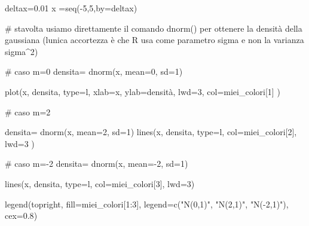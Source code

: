 \documentclass[
  italian,
  letterpaper,
]{book}
\newenvironment{Shaded}{\begin{snugshade}}{\end{snugshade}}
\newcommand{\AttributeTok}[1]{\textcolor[rgb]{0.40,0.45,0.13}{#1}}
\newcommand{\CommentTok}[1]{\textcolor[rgb]{0.37,0.37,0.37}{#1}}
\newcommand{\DecValTok}[1]{\textcolor[rgb]{0.68,0.00,0.00}{#1}}
\newcommand{\FloatTok}[1]{\textcolor[rgb]{0.68,0.00,0.00}{#1}}
\newcommand{\FunctionTok}[1]{\textcolor[rgb]{0.28,0.35,0.67}{#1}}
\newcommand{\NormalTok}[1]{\textcolor[rgb]{0.00,0.23,0.31}{#1}}
\newcommand{\OtherTok}[1]{\textcolor[rgb]{0.00,0.23,0.31}{#1}}
\newcommand{\SpecialCharTok}[1]{\textcolor[rgb]{0.37,0.37,0.37}{#1}}
\newcommand{\StringTok}[1]{\textcolor[rgb]{0.13,0.47,0.30}{#1}}
\theoremstyle{definition}
\theoremstyle{remark}
\begin{document}
\begin{Shaded}
\begin{Highlighting}[]
\NormalTok{deltax}\OtherTok{=}\FloatTok{0.01}
\NormalTok{x }\OtherTok{=}\FunctionTok{seq}\NormalTok{(}\SpecialCharTok{{-}}\DecValTok{5}\NormalTok{,}\DecValTok{5}\NormalTok{,}\AttributeTok{by=}\NormalTok{deltax)}

\CommentTok{\# stavolta usiamo direttamente il comando dnorm() per ottenere la densità della gaussiana (l\textquotesingle{}unica accortezza è che R usa come parametro sigma e non la varianza sigma\^{}2)}

\CommentTok{\# caso m=0}
\NormalTok{densita}\OtherTok{=} \FunctionTok{dnorm}\NormalTok{(x, }\AttributeTok{mean=}\DecValTok{0}\NormalTok{, }\AttributeTok{sd=}\DecValTok{1}\NormalTok{)}

\FunctionTok{plot}\NormalTok{(x, densita, }\AttributeTok{type=}\StringTok{\textquotesingle{}l\textquotesingle{}}\NormalTok{, }\AttributeTok{xlab=}\StringTok{\textquotesingle{}x\textquotesingle{}}\NormalTok{, }\AttributeTok{ylab=}\StringTok{\textquotesingle{}densità\textquotesingle{}}\NormalTok{, }\AttributeTok{lwd=}\DecValTok{3}\NormalTok{, }\AttributeTok{col=}\NormalTok{miei\_colori[}\DecValTok{1}\NormalTok{] )}

\CommentTok{\# caso m=2}

\NormalTok{densita}\OtherTok{=} \FunctionTok{dnorm}\NormalTok{(x, }\AttributeTok{mean=}\DecValTok{2}\NormalTok{, }\AttributeTok{sd=}\DecValTok{1}\NormalTok{)}
\FunctionTok{lines}\NormalTok{(x, densita, }\AttributeTok{type=}\StringTok{\textquotesingle{}l\textquotesingle{}}\NormalTok{,  }\AttributeTok{col=}\NormalTok{miei\_colori[}\DecValTok{2}\NormalTok{], }\AttributeTok{lwd=}\DecValTok{3}\NormalTok{ )}


\CommentTok{\# caso m={-}2}
\NormalTok{densita}\OtherTok{=} \FunctionTok{dnorm}\NormalTok{(x, }\AttributeTok{mean=}\SpecialCharTok{{-}}\DecValTok{2}\NormalTok{, }\AttributeTok{sd=}\DecValTok{1}\NormalTok{)}


\FunctionTok{lines}\NormalTok{(x, densita, }\AttributeTok{type=}\StringTok{\textquotesingle{}l\textquotesingle{}}\NormalTok{,  }\AttributeTok{col=}\NormalTok{miei\_colori[}\DecValTok{3}\NormalTok{], }\AttributeTok{lwd=}\DecValTok{3}\NormalTok{)}

\FunctionTok{legend}\NormalTok{(}\StringTok{\textquotesingle{}topright\textquotesingle{}}\NormalTok{, }\AttributeTok{fill=}\NormalTok{miei\_colori[}\DecValTok{1}\SpecialCharTok{:}\DecValTok{3}\NormalTok{], }\AttributeTok{legend=}\FunctionTok{c}\NormalTok{(}\StringTok{"N(0,1)"}\NormalTok{, }\StringTok{"N(2,1)"}\NormalTok{, }\StringTok{"N({-}2,1)"}\NormalTok{), }\AttributeTok{cex=}\FloatTok{0.8}\NormalTok{)}
\end{Highlighting}
\end{Shaded}
\end{document}
